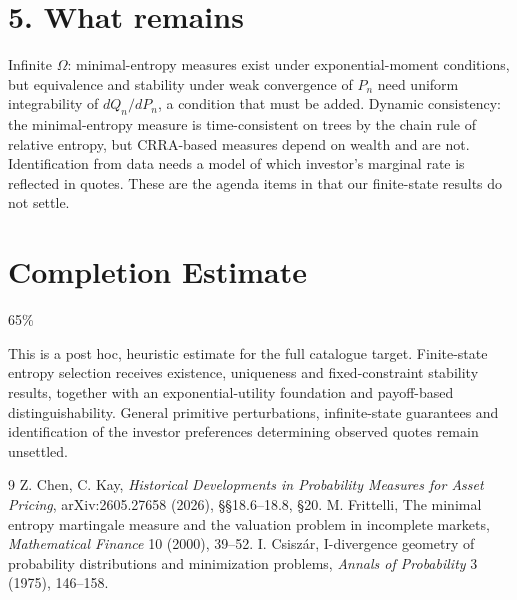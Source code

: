 \documentclass[11pt]{article}
\theoremstyle{definition}
\begin{document}
\section*{5. What remains}
Infinite $\Omega$: minimal-entropy measures exist under exponential-moment conditions, but equivalence and stability under
weak convergence of $P_n$ need uniform integrability of $dQ_n/dP_n$, a condition that must be added. Dynamic consistency:
the minimal-entropy measure is time-consistent on trees by the chain rule of relative entropy, but CRRA-based measures
depend on wealth and are not. Identification from data needs a model of which investor's marginal rate is reflected in
quotes. These are the agenda items in \cite{ck} that our finite-state results do not settle.

\section{Completion Estimate}
65\%

This is a post hoc, heuristic estimate for the full catalogue target.
Finite-state entropy selection receives existence, uniqueness and fixed-constraint stability results, together with an exponential-utility foundation and payoff-based distinguishability. General primitive perturbations, infinite-state guarantees and identification of the investor preferences determining observed quotes remain unsettled.

\begin{thebibliography}{9}
 Z. Chen, C. Kay, \emph{Historical Developments in Probability Measures for Asset Pricing}, arXiv:2605.27658 (2026), \S\S18.6--18.8, \S20.
 M. Frittelli, The minimal entropy martingale measure and the valuation problem in incomplete markets,
\emph{Mathematical Finance} 10 (2000), 39--52.
 I. Csisz\'ar, I-divergence geometry of probability distributions and minimization problems,
\emph{Annals of Probability} 3 (1975), 146--158.
\end{thebibliography}
\end{document}
